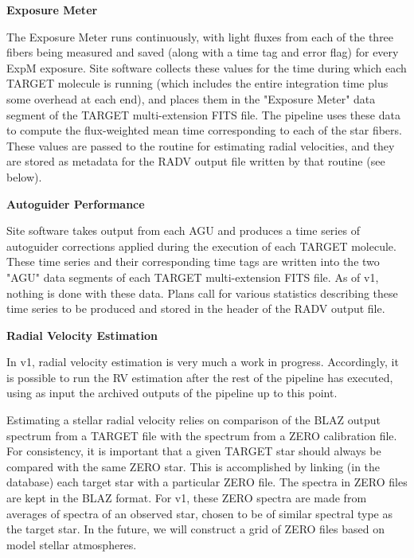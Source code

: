 \vskip12pt
\parindent=0pt
{\bf{Exposure Meter}}
\vskip8pt
\parindent20pt


The Exposure Meter runs continuously, with light fluxes from each of the three
fibers being measured and saved (along with a time tag and error flag) for
every ExpM exposure.  Site software collects these values for the time during
which each TARGET molecule is running (which includes the entire integration
time plus some overhead at each end), and places them in the "Exposure Meter"
data segment of the TARGET multi-extension FITS file.  The pipeline uses
these data to compute the flux-weighted mean time corresponding to each of
the star fibers. These values are passed to the routine for estimating radial
velocities, and they are stored as metadata for the RADV output file written
by that routine (see below).
  
\vskip12pt
\parindent=0pt
{\bf{Autoguider Performance} }
\vskip8pt
\parindent20pt

Site software takes output from each AGU and produces a time series of
autoguider corrections applied during the execution of each TARGET molecule.
These time series and their corresponding time tags are written into the
two "AGU" data segments of each TARGET multi-extension FITS file.  As of v1,
nothing is done with these data.  Plans call for various statistics describing
these time series to be produced and stored in the header of the RADV output
file.

\vskip12pt
\parindent=0pt
{\bf{Radial Velocity Estimation}}
\vskip8pt
\parindent20pt

In v1, radial velocity estimation is very much a work in progress.  Accordingly,
it is possible to run the RV estimation after the rest of the pipeline has
executed, using as input the archived outputs of the
pipeline up to this point.

Estimating a stellar radial velocity relies on comparison of the BLAZ output
spectrum from a TARGET file with the spectrum from a ZERO calibration file.
For consistency, it is important that a given TARGET star should always be
compared with the same ZERO star.  This is accomplished by linking 
(in the database) each
target star with a particular ZERO file.
The spectra in ZERO files are kept in the BLAZ format.
For v1, these ZERO spectra are made from averages of spectra of an observed 
star, chosen to be of similar spectral type as the target star.
In the future, we will construct a grid of ZERO files based on model stellar
atmospheres.

